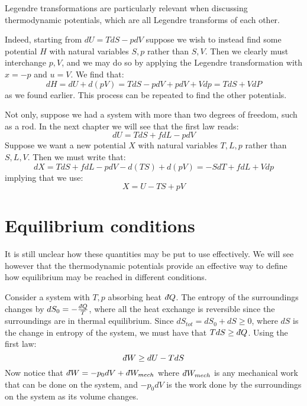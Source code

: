 \documentclass[a4paper,11pt,oneside]{book}
\newcommand{\dbar}{d\hspace*{-0.08em}\bar{}\hspace*{0.1em}}
\begin{document}
Legendre transformations are particularly relevant when discussing thermodynamic potentials, which are all Legendre transforms of each other. 


Indeed, starting from $dU= TdS -p dV$ suppose we wish to instead find some potential $H$ with natural variables $S,p$ rather than $S,V$. Then we clearly must interchange $p,V$, and we may do so by applying the Legendre transformation with $x=-p$ and $u=V$. We find that:
\begin{equation}
    dH = dU+d(pV) = TdS - pdV + pdV + Vdp = TdS + VdP
\end{equation}
as we found earlier. This process can be repeated to find the other potentials. 


Not only, suppose we had a system with more than two degrees of freedom, such as a rod. In the next chapter we will see that the first law reads:
\begin{equation}
    dU = TdS + fdL - pdV
\end{equation}
Suppose we want a new potential $X$ with natural variables $T,L,p$ rather than $S,L,V$. Then we must write that:
\begin{equation}
    dX = TdS + fdL - pdV - d(TS)+d(pV)=-SdT + fdL + Vdp
\end{equation}
implying that we use:
\begin{equation}
    X = U-TS+pV
\end{equation}
\section{Equilibrium conditions}
It is still unclear how these quantities may be put to use effectively. We will see however that the thermodynamic potentials provide an effective way to define how equilibrium may be reached in different conditions. 


Consider a system with $T,p$ absorbing heat $\dbar Q$. The entropy of the surroundings changes by $dS_0 = - \frac{\dbar Q}{T}$, where all the heat exchange is reversible since the surroundings are in thermal equilibrium. Since $dS_{tot} = dS_0 + dS \geq 0$, where $dS$ is the change in entropy of the system, we must have that $T dS \geq \dbar Q$. Using the first law:
\begin{equation}
    \dbar W \geq dU - TdS
\end{equation}
Now notice that $\dbar W = -p_0 dV + \dbar W_{mech}$ where $\dbar W_{mech}$ is any mechanical work that can be done on the system, and $-p_0 dV$ is the work done by the surroundings on the system as its volume changes. 
\end{document}
